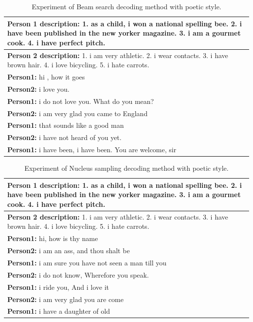 \begin{table}
\centering
 \begin{tabular}{|p{14cm}|} 
 \hline
 \textbf{Person 1 description:} 1. as a child, i won a national spelling bee. 2. i have been published in the new yorker magazine. 3. i am a gourmet cook. 4. i have perfect pitch. \\
 \hline
 \textbf{Person 2 description:} 1. i am very athletic. 2. i wear contacts. 3. i have brown hair. 4. i love bicycling. 5. i hate carrots. \\
 \hline
 \textbf{Person1:} hi , how it goes \\
 \textbf{Person2:} i love you. \\
 \textbf{Person1:} i do not love you. What do you mean? \\
 \textbf{Person2:} i am very glad you came to England \\
 \textbf{Person1:} that sounds like a good man \\
 \textbf{Person2:} i have not heard of you yet. \\
 \textbf{Person1:} i have been, i have been. You are welcome, sir \\
 \hline
 \end{tabular}
 \caption{Experiment of Beam search decoding method with poetic style.}
\label{tab:beam_search}
\end{table}

\begin{table}
\centering
 \begin{tabular}{|p{14cm}|} 
 \hline
 \textbf{Person 1 description:} 1. as a child, i won a national spelling bee. 2. i have been published in the new yorker magazine. 3. i am a gourmet cook. 4. i have perfect pitch. \\
 \hline
 \textbf{Person 2 description:} 1. i am very athletic. 2. i wear contacts. 3. i have brown hair. 4. i love bicycling. 5. i hate carrots. \\
 \hline
 \textbf{Person1:} hi, how is thy name \\
 \textbf{Person2:} i am an ass, and thou shalt be \\
 \textbf{Person1:} i am sure you have not seen a man till you \\
 \textbf{Person2:} i do not know, Wherefore you speak. \\
 \textbf{Person1:} i ride you, And i love it \\
 \textbf{Person2:} i am very glad you are come \\
 \textbf{Person1:} i have a daughter of old \\
 \hline
 \end{tabular}
 \caption{Experiment of Nucleus sampling decoding method with poetic style.}
\label{tab:nucleus_sampling}
\end{table}

